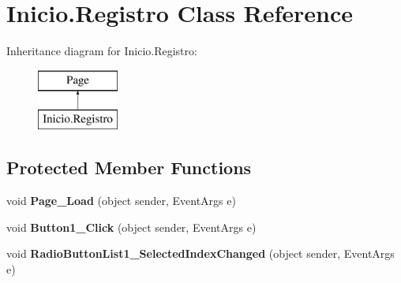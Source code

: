 \hypertarget{class_inicio_1_1_registro}{}\section{Inicio.\+Registro Class Reference}
\label{class_inicio_1_1_registro}
Inheritance diagram for Inicio.\+Registro\+:\begin{figure}[H]
\begin{center}
\leavevmode
\includegraphics[height=2.000000cm]{class_inicio_1_1_registro}
\end{center}
\end{figure}
\subsection*{Protected Member Functions}
\begin{DoxyCompactItemize}
\item 
\mbox{\label{class_inicio_1_1_registro_a7208153fb65c746caeeadda5c34b96a7}} 
void {\bfseries Page\+\_\+\+Load} (object sender, Event\+Args e)
\item 
\mbox{\label{class_inicio_1_1_registro_a5fd08d11649d5319490065cdf317cdd0}} 
void {\bfseries Button1\+\_\+\+Click} (object sender, Event\+Args e)
\item 
\mbox{\label{class_inicio_1_1_registro_a3622e0de22647c232c2d664a90cb9798}} 
void {\bfseries Radio\+Button\+List1\+\_\+\+Selected\+Index\+Changed} (object sender, Event\+Args e)
\end{DoxyCompactItemize}
